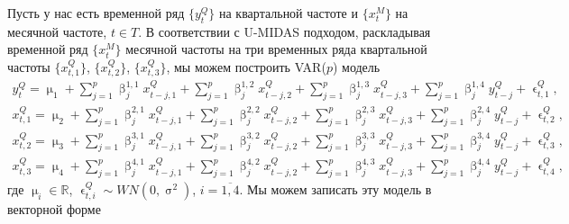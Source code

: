 \documentclass[a4paper, 14pt]{extreport}
\numberwithin{equation}{section}
\renewcommand{\beta}{\upbeta}
\renewcommand{\epsilon}{\upvarepsilon}
\renewcommand{\mu}{\upmu}
\renewcommand{\sigma}{\upsigma}
\numberwithin{equation}{section}
\begin{document}
	Пусть у нас есть временной ряд $\{y_t^Q\}$ на квартальной частоте и $\{x_t^M\}$ на месячной частоте, $t\in T$. В соответствии с U-MIDAS подходом, раскладывая временной ряд $\{x_t^M\}$ месячной частоты на три временных ряда квартальной частоты $\{x_{t,1}^Q\}$, $\{x_{t,2}^Q\}$, $\{x_{t,3}^Q\}$, мы можем построить VAR($p$) модель
	\begin{equation}
		\begin{aligned}
			y_t^Q = \mu_1 + \sum_{j = 1}^p \beta_j^{1,1} x_{t-j,1}^Q + \sum_{j = 1}^p \beta_j^{1,2} x_{t-j,2}^Q + \sum_{j = 1}^p \beta_j^{1,3} x_{t-j,3}^Q + \sum_{j = 1}^p \beta_j^{1,4} y_{t-j}^Q + \epsilon_{t,1}^Q,\\
			x_{t,1}^Q = \mu_2 + \sum_{j = 1}^p \beta_j^{2,1} x_{t-j,1}^Q + \sum_{j = 1}^p \beta_j^{2,2} x_{t-j,2}^Q + \sum_{j = 1}^p \beta_j^{2,3} x_{t-j,3}^Q + \sum_{j = 1}^p \beta_j^{2,4} y_{t-j}^Q + \epsilon_{t,2}^Q,\\
			x_{t,2}^Q = \mu_3 + \sum_{j = 1}^p \beta_j^{3,1} x_{t-j,1}^Q + \sum_{j = 1}^p \beta_j^{3,2} x_{t-j,2}^Q + \sum_{j = 1}^p \beta_j^{3,3} x_{t-j,3}^Q + \sum_{j = 1}^p \beta_j^{3,4} y_{t-j}^Q + \epsilon_{t,3}^Q,\\
			x_{t,3}^Q = \mu_4 + \sum_{j = 1}^p \beta_j^{4,1} x_{t-j,1}^Q + \sum_{j = 1}^p \beta_j^{4,2} x_{t-j,2}^Q + \sum_{j = 1}^p \beta_j^{4,3} x_{t-j,3}^Q + \sum_{j = 1}^p \beta_j^{4,4} y_{t-j}^Q + \epsilon_{t,4}^Q,
		\end{aligned}
	\end{equation}
	где $\mu_i \in \mathbb R$, $\epsilon_{t,i}^Q \sim WN(0,\sigma^2)$, $i = \overline{1,4}$.
	Мы можем записать эту модель в векторной форме
\end{document}
